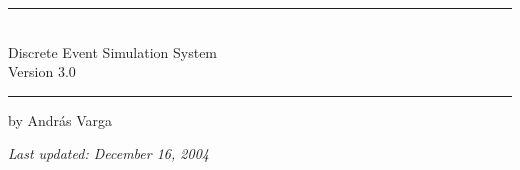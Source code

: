 

\begin{center}\end{center}
\vspace{16em}
\hrule
\vspace{2em}
\begin{center}
\tbf{{\huge {\opp}}}\\
\vspace{1.5em}
{\LARGE Discrete Event Simulation System}\\
\vspace{1em}
{\large Version 3.0}\\
\vspace{1em}
\end{center}
\vspace{2em}
\hrule

\vspace{4em}
by {\large Andr\'{a}s Varga}
\vspace{3em}

\textit{Last updated: December 16, 2004}



